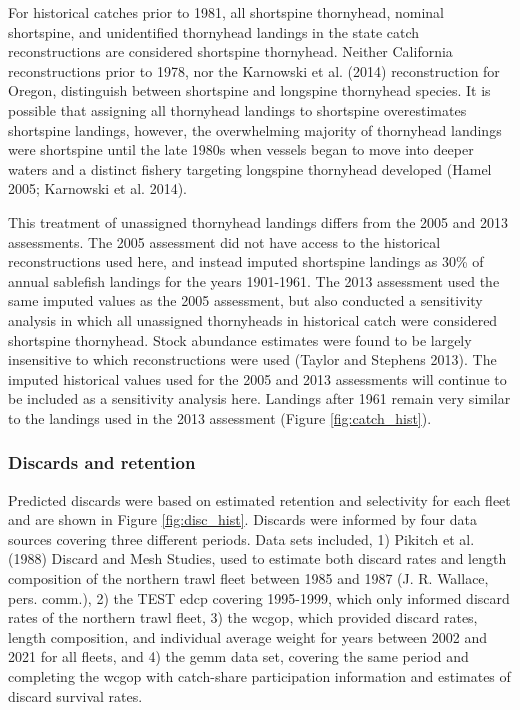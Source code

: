 \documentclass[11pt,
  english,
  letterpaper,
]{article}
\begin{document}
For historical catches prior to 1981, all shortspine thornyhead, nominal shortspine, and unidentified thornyhead landings in the state catch reconstructions are considered shortspine thornyhead. Neither California reconstructions prior to 1978, nor the Karnowski et al. (2014) reconstruction for Oregon, distinguish between shortspine and longspine thornyhead species. It is possible that assigning all thornyhead landings to shortspine overestimates shortspine landings, however, the overwhelming majority of thornyhead landings were shortspine until the late 1980s when vessels began to move into deeper waters and a distinct fishery targeting longspine thornyhead developed (Hamel 2005; Karnowski et al. 2014).

This treatment of unassigned thornyhead landings differs from the 2005 and 2013 assessments. The 2005 assessment did not have access to the historical reconstructions used here, and instead imputed shortspine landings as 30\% of annual sablefish landings for the years 1901-1961. The 2013 assessment used the same imputed values as the 2005 assessment, but also conducted a sensitivity analysis in which all unassigned thornyheads in historical catch were considered shortspine thornyhead. Stock abundance estimates were found to be largely insensitive to which reconstructions were used (Taylor and Stephens 2013). The imputed historical values used for the 2005 and 2013 assessments will continue to be included as a sensitivity analysis here. Landings after 1961 remain very similar to the landings used in the 2013 assessment (Figure \ref{fig:catch_hist}).

\hypertarget{discards-and-retention}{%
\subsubsection{Discards and retention}\label{discards-and-retention}}

Predicted discards were based on estimated retention and selectivity for each fleet and are shown in Figure \ref{fig:disc_hist}. Discards were informed by four data sources covering three different periods. Data sets included, 1) Pikitch et al. (1988) Discard and Mesh Studies, used to estimate both discard rates and length composition of the northern trawl fleet between 1985 and 1987 (J. R. Wallace, pers. comm.), 2) the TEST \gls{edcp} covering 1995-1999, which only informed discard rates of the northern trawl fleet, 3) the \gls{wcgop}, which provided discard rates, length composition, and individual average weight for years between 2002 and 2021 for all fleets, and 4) the \gls{gemm} data set, covering the same period and completing the \gls{wcgop} with catch-share participation information and estimates of discard survival rates.
\end{document}
